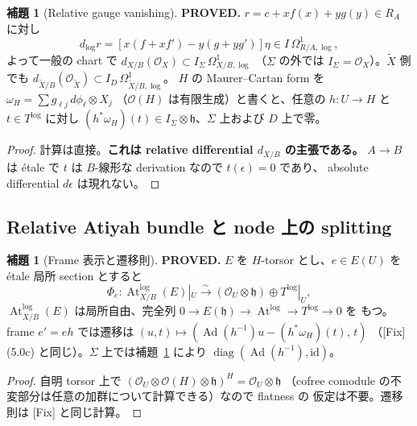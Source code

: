 \documentclass[11pt,a4paper]{article}
\numberwithin{equation}{section}
\theoremstyle{definition}
\newtheorem{lemma}[definition]{補題}
\DeclareMathOperator{\Ad}{Ad}
\newcommand{\OO}{\mathcal O}
\newcommand{\h}{\mathfrak h}
\newcommand{\Atlog}{\operatorname{At}^{\log}}
\newcommand{\tX}{\widetilde X}
\begin{document}
\begin{lemma}[Relative gauge vanishing]\label{lem:gauge}
\textbf{PROVED.} $r=c+xf(x)+yg(y)\in R_A$ に対し
\[
  d_{\log}r=[x(f+xf')-y(g+yg')]\eta\in I\,\Omega^1_{R/A,\log},
\]
よって一般の chart で $d_{X/B}(\OO_X)\subset I_\Sigma\,\Omega^1_{X/B,\log}$
（$\Sigma$ の外では $I_\Sigma=\OO_X$）。$\tX$ 側でも
$d_{\tX/B}(\OO_{\tX})\subset I_D\,\Omega^1_{\tX/B,\log}$。
$H$ の Maurer--Cartan form を $\omega_H=\sum g_{\ell j}\,d\phi_\ell\otimes X_j$
（$\OO(H)$ は有限生成）と書くと、任意の $h:U\to H$ と $t\in T^{\log}$ に対し
$(h^*\omega_H)(t)\in I_\Sigma\otimes\h$、$\Sigma$ 上および $D$ 上で零。
\end{lemma}

\begin{proof}
計算は直接。\textbf{これは relative differential $d_{X/B}$ の主張である。}
$A\to B$ は étale で $t$ は $B$-線形な derivation なので $t(\epsilon)=0$ であり、
absolute differential $d\epsilon$ は現れない。
\end{proof}

\subsection{Relative Atiyah bundle と node 上の splitting}

\begin{lemma}[Frame 表示と遷移則]\label{lem:frame}
\textbf{PROVED.} $E$ を $H$-torsor とし、$e\in E(U)$ を étale 局所 section
とすると
\[
  \Phi_e:\Atlog_{X/B}(E)|_U\xrightarrow{\sim}(\OO_U\otimes\h)\oplus T^{\log}|_U,
\]
$\Atlog_{X/B}(E)$ は局所自由、完全列 $0\to E(\h)\to\Atlog\to T^{\log}\to0$ を
もつ。frame $e'=eh$ では遷移は
$(u,t)\mapsto(\Ad(h^{-1})u-(h^*\omega_H)(t),\,t)$
（[Fix] (5.0c) と同じ）。$\Sigma$ 上では補題~\ref{lem:gauge} により
$\operatorname{diag}(\Ad(h^{-1}),\mathrm{id})$。
\end{lemma}

\begin{proof}
自明 torsor 上で $(\OO_U\otimes\OO(H)\otimes\h)^H=\OO_U\otimes\h$
（cofree comodule の不変部分は任意の加群について計算できる）なので flatness の
仮定は不要。遷移則は [Fix] と同じ計算。
\end{proof}
\end{document}
